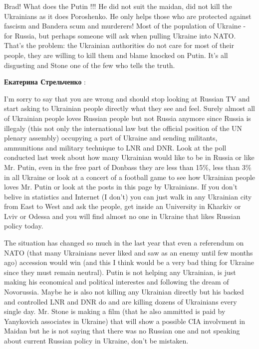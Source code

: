 \begin{itemize}
\begin{itemize}

Brad! What does the Putin !!! He did not suit the maidan, did not kill the
Ukrainians as it does Poroshenko. He only helps those who are protected against
fascism and Bandera scum and murderers! Most of the population of Ukraine - for
Russia, but perhaps someone will ask when pulling Ukraine into NATO. That's the
problem: the Ukrainian authorities do not care for most of their people, they
are willing to kill them and blame knocked on Putin. It's all disgusting and
Stone one of the few who tells the truth.

\textbf{Екатерина Стрельченко} : 

I'm sorry to say that you are wrong and should stop looking at Russian TV and
start asking to Ukrainian people directly what they see and feel. Surely almost
all of Ukrainian people loves Russian people but not Russia anymore since
Russia is illegaly (this not only the international law but the official
position of the UN plenary assembly) occupying a part of Ukraine and sending
militants, ammunitions and military technique to LNR and DNR. Look at the poll
conducted last week about how many Ukrainian would like to be in Russia or like
Mr. Putin, even in the free part of Donbass they are less than 15\%, less than
3\% in all Ukraine or look at a concert of a football game to see how Ukrainian
people loves Mr. Putin or look at the posts in this page by Ukrainians. If you
don't belive in statistics and Internet (I don't) you can just walk in any
Ukrainian city from East to West and ask the people, get inside an University
in Kharkiv or Lviv or Odessa and you will find almost no one in Ukraine that
likes Russian policy today. 

The situation has changed so much in the last year
that even a referendum on NATO (that many Ukrainians never liked and saw as an
enemy until few months ago) accession would win (and this I think would be a
very bad thing for Ukraine since they must remain neutral). Putin is not
helping any Ukrainian, is just making his economical and political interestes
and following the dream of Novorussia. Maybe he is also not killing any
Ukrainian directly but his backed and controlled LNR and DNR do and are killing
dozens of Ukrainians every single day. Mr. Stone is making a film (that he also
ammitted is paid by Yanykovich associates in Ukraine) that will show a possible
CIA involvment in Maidan but he is not saying that there was no Russian one and
not speaking about current Russian policy in Ukraine, don't be mistaken. 


\end{itemize}
\end{itemize}
